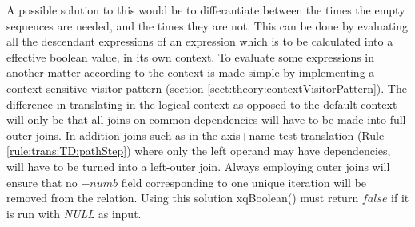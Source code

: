 A possible solution to this would be to differantiate between the times the empty sequences are needed, and the
times they are not. This can be done by evaluating all the descendant
expressions of an expression which is to be calculated into a effective boolean value, in its own context. To evaluate some expressions in another matter
according to the context is made simple by implementing a context sensitive visitor pattern (section
\ref{sect:theory:contextVisitorPattern}). The difference in translating in the logical context as opposed to the
default context will only be that all joins on common dependencies will have to be made into full outer joins. In
addition joins such as in the axis+name test translation (Rule \ref{rule:trans:TD:pathStep}) where only the left
operand may have dependencies, will have to be turned into a left-outer join. Always employing outer joins will
ensure that no $-numb$ field corresponding to one unique iteration will be removed from the relation. Using this
solution \textsf{xqBoolean()} must return $false$ if it is run with \textit{NULL} as input.